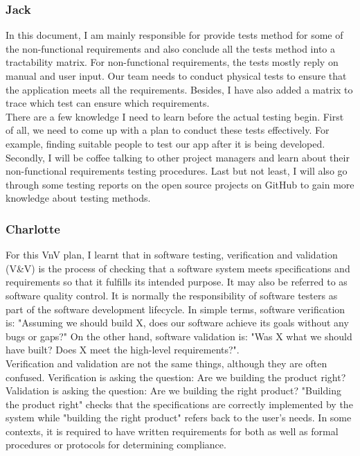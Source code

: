 \documentclass[12pt, titlepage]{article}
\begin{document}
\subsubsection{Jack}
In this document, I am mainly responsible for provide tests method for some of the non-functional requirements and also conclude all the tests method into a tractability matrix. For non-functional requirements, the tests mostly reply on manual and user input. Our team needs to conduct physical tests to ensure that the application meets all the requirements. Besides, I have also added a matrix to trace which test can ensure which requirements.\\

\newline
There are a few knowledge I need to learn before the actual testing begin. First of all, we need to come up with a plan to conduct these tests effectively. For example, finding suitable people to test our app after it is being developed. Secondly, I will be coffee talking to other project managers and learn about their non-functional requirements testing procedures. Last but not least, I will also go through some testing reports on the open source projects on GitHub to gain more knowledge about testing methods.




\subsubsection{Charlotte}
For this VnV plan, I learnt that in software testing, verification and validation (V&V) is the process of checking that a software system meets specifications and requirements so that it fulfills its intended purpose. It may also be referred to as software quality control. It is normally the responsibility of software testers as part of the software development lifecycle. In simple terms, software verification is: "Assuming we should build X, does our software achieve its goals without any bugs or gaps?" On the other hand, software validation is: "Was X what we should have built? Does X meet the high-level requirements?".\\

Verification and validation are not the same things, although they are often confused. Verification is asking the question: Are we building the product right?
Validation is asking the question: Are we building the right product? "Building the product right" checks that the specifications are correctly implemented by the system while "building the right product" refers back to the user's needs. In some contexts, it is required to have written requirements for both as well as formal procedures or protocols for determining compliance. 
\newline
\end{document}
